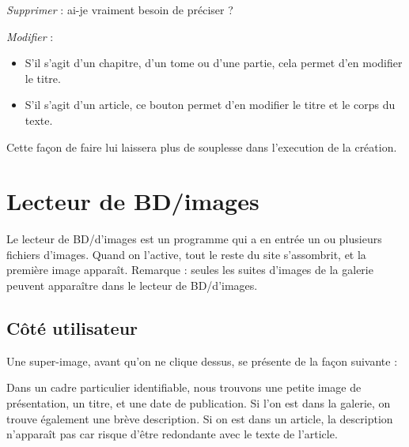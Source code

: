 \documentclass[french]{report}
\theoremstyle{plain}
\begin{document}
				\emph{Supprimer} : ai-je vraiment besoin de préciser ?
				
				\emph{Modifier} :
				\begin{itemize}
					\item S'il s'agit d'un chapitre, d'un tome ou d'une partie, cela permet d'en modifier le titre.
					\item S'il s'agit d'un article, ce bouton permet d'en modifier le titre et le corps du texte.
				\end{itemize}

				\phantom{gras}

				Cette façon de faire lui laissera plus de souplesse dans l'execution de la création.













\chapter{Lecteur de BD/images} \label{lecteur_images}
	Le lecteur de BD/d'images est un programme qui a en entrée un ou plusieurs fichiers d'images. Quand on l'active, tout le reste du site s'assombrit, et la première image apparaît. Remarque : seules les suites d'images de la galerie peuvent apparaître dans le lecteur de BD/d'images.

	\section{Côté utilisateur}
		
		Une super-image, avant qu'on ne clique dessus, se présente de la façon suivante :
		
		Dans un cadre particulier identifiable, nous trouvons une petite image de présentation, un titre, et une date de publication. Si l'on est dans la galerie, on trouve également une brève description. Si on est dans un article, la description n'apparaît pas car risque d'être redondante avec le texte de l'article.
\end{document}
